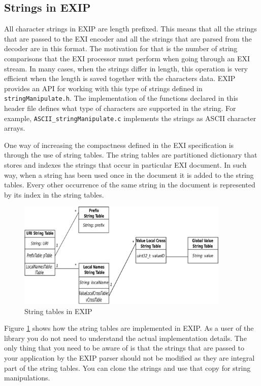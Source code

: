 \subsection{Strings in EXIP}
\label{sec:strings}

All character strings in EXIP are length prefixed. This means that all the strings that are passed to
the EXI encoder and all the strings that are parsed from the decoder are in this format. The motivation
for that is the number of string comparisons that the EXI processor must perform when going through an
EXI stream. In many cases, when the strings differ in length, this operation is very efficient
when the length is saved together with the characters data. EXIP provides an API for working with
this type of strings defined in \texttt{stringManipulate.h}. The implementation of the functions
declared in this header file defines what type of characters are supported in the string.
For example, \texttt{ASCII\_stringManipulate.c} implements the strings as ASCII character arrays.

One way of increasing the compactness defined in the EXI specification is through the use of string tables.
The string tables are partitioned dictionary that stores and indexes the strings that occur in particular
EXI document. In such way, when a string has been used once in the document it is added to the string tables.
Every other occurrence of the same string in the document is represented by its index in the string tables.

\begin{figure}[h!]
 \begin{center}
 \includegraphics[width=0.90\textwidth, keepaspectratio=true]{images/StringTablesDiag.pdf}
\end{center}
\caption{String tables in EXIP}
\label{fig:EXIP-string-tables} 
\end{figure} 

Figure \ref{fig:EXIP-string-tables} shows how the string tables are implemented in EXIP. As a user of
the library you do not need to understand the actual implementation details. The only thing that you need
to be aware of is that the strings that are passed to your application by the EXIP parser should not be
modified as they are integral part of the string tables. You can clone the strings and use that copy
for string manipulations.

